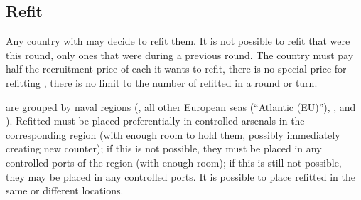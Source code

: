 



\subsection{Refit}
Any country with  \ND may decide to refit them. It is not
possible to refit \ND that were  this round, only ones that
were  during a previous round. The country must pay half the
recruitment price of each \ND it wants to refit, there is no special price for
refitting \FLEET, there is no limit to the number of \ND refitted in a round
or turn.

 \ND are grouped by naval regions (, all
other European seas (``Atlantic (EU)''), , 
and ). Refitted \ND must be placed preferentially in
controlled arsenals in the corresponding region (with enough room to hold
them, possibly immediately creating new \FLEET counter); if this is not
possible, they must be placed in any controlled ports of the region (with
enough room); if this is still not possible, they may be placed in any
controlled ports. It is possible to place refitted \ND in the same or
different locations.

